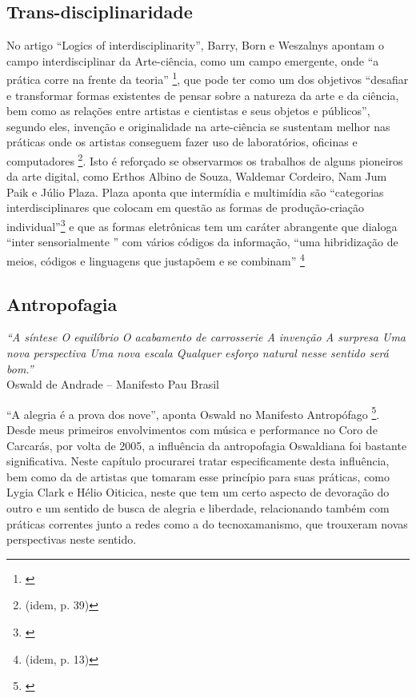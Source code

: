 {\subsection{Trans-disciplinaridade}
No artigo ``Logics of interdisciplinarity'', Barry, Born e Weszalnys apontam o campo interdisciplinar da Arte-ciência, como um campo emergente, onde ``a prática corre na frente da teoria'' \footnote{\cite{Barry2008}}, que pode ter como um dos objetivos ``desafiar e transformar formas existentes de pensar sobre a natureza da arte e da ciência, bem como as relações entre artistas e cientistas e seus objetos e públicos'', segundo eles, invenção e originalidade na arte-ciência se sustentam melhor nas práticas onde os artistas conseguem fazer uso de laboratórios, oficinas e computadores \footnote{(idem, p. 39)}. Isto é reforçado se observarmos os trabalhos de alguns pioneiros da arte digital, como Erthos Albino de Souza, Waldemar Cordeiro, Nam Jum Paik e Júlio Plaza. 
Plaza aponta que intermídia e multimídia são ``categorias interdisciplinares  que colocam em questão as formas de produção-criação individual''\footnote{\cite[66]{JulioPlaza1969}} e que as formas eletrônicas tem um caráter abrangente que dialoga ``inter sensorialmente '' com vários códigos da informação, ``uma hibridização de meios, códigos e linguagens que justapõem e se combinam'' \footnote{(idem, p. 13)}

\subsection{Antropofagia}

    \begin{flushright}
        \textit{``A síntese
O equilíbrio
O acabamento de carrosserie
A invenção
A surpresa
Uma nova perspectiva
Uma nova escala
Qualquer esforço natural nesse sentido será bom.''} \\
Oswald de Andrade – Manifesto Pau Brasil    \end{flushright}

``A alegria é a prova dos nove'', aponta Oswald no Manifesto Antropófago \footnote{\cite{Andrade1928}}. Desde meus primeiros envolvimentos com música e performance no Coro de Carcarás, por volta de 2005, a influência da antropofagia Oswaldiana foi bastante significativa. Neste capítulo procurarei tratar especificamente desta influência, bem como da de artistas que tomaram esse princípio para suas práticas, como Lygia Clark e Hélio Oiticica, neste que tem um certo aspecto de devoração do outro e um sentido de busca de alegria e liberdade, relacionando também com práticas correntes junto a redes como a do tecnoxamanismo, que trouxeram novas perspectivas neste sentido.


}
